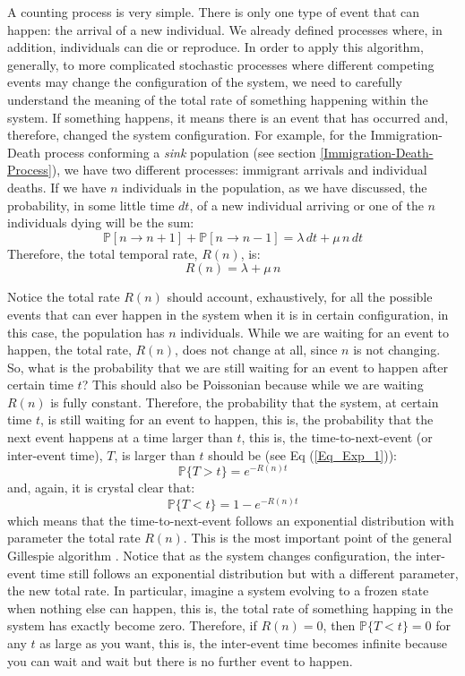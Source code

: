 \documentclass{article}
\newcommand{\Pb}{{\mathbb P}}
\begin{document}
A counting process is very simple. There is only one type of event that can happen: the arrival of a new individual. We already defined processes where, in addition, individuals can die or reproduce. In order to apply this algorithm, generally, to more complicated stochastic processes where different competing events may change the configuration of the system, we need to carefully understand the meaning of the total rate of something happening within the system. If something happens, it means there is an event that has occurred and, therefore, changed the system configuration. For example, for the Immigration-Death process conforming a \textit{sink} population (see section \ref{Immigration-Death-Process}), we have two different processes: immigrant arrivals and individual deaths. If we have $n$ individuals in the population, as we have discussed, the probability, in some little time $dt$, of a new individual arriving or one of the $n$ individuals dying will be the sum:
\begin{equation} 
\Pb[n \rightarrow n+1] + \Pb[n \rightarrow n-1] = \lambda\,dt + \mu \, n \,dt
\end{equation}
Therefore, the total temporal rate, $R(n)$, is:
\begin{equation} 
R(n) = \lambda + \mu \, n
\end{equation}
\smallskip

Notice the total rate $R(n)$ should account, exhaustively, for all the possible events that can ever happen in the system when it is in certain configuration, in this case, the population has $n$ individuals. While we are waiting for an event to happen, the total rate, $R(n)$, does not change at all, since $n$ is not changing. So, what is the probability that we are still waiting for an event to happen after certain time $t$? This should also be Poissonian because while we are waiting $R(n)$ is fully constant. Therefore, the probability that the system, at certain time $t$, is still waiting for an event to happen, this is, the probability that the next event happens at a time larger than $t$, this is, the time-to-next-event (or inter-event time), $T$, is larger than $t$ should be (see Eq (\ref{Eq_Exp_1})):
\begin{equation}
\Pb\{T>t\} =  e^{-R(n) t}
\end{equation}
and, again, it is crystal clear that:
\begin{equation}
\Pb\{T<t\} =  1 - e^{-R(n) t}
\end{equation}
which means that the time-to-next-event follows an exponential distribution with parameter the total rate $R(n)$. This is the most important point of the general Gillespie algorithm \citep{Gillespie76}. Notice that as the system changes configuration, the inter-event time still follows an exponential distribution but with a different parameter, the new total rate. In particular, imagine a system evolving to a frozen state when nothing else can happen, this is, the total rate of something happing in the system has exactly become zero. Therefore, if $R(n) = 0$, then $\Pb\{T<t\} = 0$ for any $t$ as large as you want, this is, the inter-event time becomes infinite because you can wait and wait but there is no further event to happen.  
\smallskip
\end{document}
